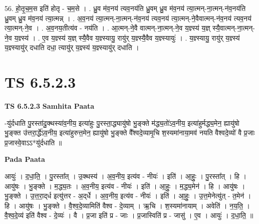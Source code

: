 \documentclass[17pt]{extarticle}
\begin{document}
56. हो॒तृ॒च॒म॒स इति॑ होतृ - च॒म॒से । . ध्रु॒व म॑व॒नय॑ त्यव॒नय॑ति ध्रु॒वम् ध्रु॒व म॑व॒नय॑ त्या॒त्मन्-ना॒त्मन्-न॑व॒नय॑ति ध्रु॒वम् ध्रु॒व म॑व॒नय॑ त्या॒त्मन्न् । . अ॒व॒नय॑ त्या॒त्मन्-ना॒त्मन्-न॑व॒नय॑ त्यव॒नय॑ त्या॒त्मन्-ने॒वैवात्मन्-न॑व॒नय॑ त्यव॒नय॑ त्या॒त्मन्-ने॒व । . अ॒व॒नय॒तीत्य॑व - नय॑ति । . आ॒त्मन्-ने॒वै वात्मन्-ना॒त्मन्-ने॒व य॒ज्ञ्स्य॑ य॒ज्ञ् स्यै॒वात्मन्-ना॒त्मन्-ने॒व य॒ज्ञ्स्य॑ । . ए॒व य॒ज्ञ्स्य॑ य॒ज्ञ् स्यै॒वैव य॒ज्ञ्स्यायु॒ रायु॑र् य॒ज्ञ्स्यै॒वैव य॒ज्ञ्स्यायुः॑ । . य॒ज्ञ्स्यायु॒ रायु॑र् य॒ज्ञ्स्य॑ य॒ज्ञ्स्यायु॑र् दधाति दधा॒ त्यायु॑र् य॒ज्ञ्स्य॑ य॒ज्ञ्स्यायु॑र् दधाति । \newline
\pagebreak
{}

\section{ TS 6.5.2.3 }

\textbf{TS 6.5.2.3 } \newline
\textbf{Samhita Paata} \newline

-यु॑र्दधाति पु॒रस्ता॑दु॒क्थस्या॑व॒नीय॒ इत्या॑हुः पु॒रस्ता॒द्ध्यायु॑षो भु॒ङ्क्ते म॑द्ध्य॒तो॑ऽव॒नीय॒ इत्या॑हुर्मद्ध्य॒मेन॒ ह्यायु॑षो भु॒ङ्क्त उ॑त्तरा॒र्द्धे॑ऽव॒नीय॒ इत्या॑हुरुत्त॒मेन॒ ह्यायु॑षो भु॒ङ्क्ते वै᳚श्वदे॒व्यामृ॒चि श॒स्यमा॑नाया॒मव॑ नयति वैश्वदे॒व्यो॑ वै प्र॒जाः प्र॒जास्वे॒वाऽऽ*यु॑र्दधाति ॥ \newline

\textbf{Pada Paata} \newline

आयुः॑ । द॒धा॒ति॒ । पु॒रस्ता᳚त् । उ॒क्थस्य॑ । अ॒व॒नीय॒ इत्य॑व - नीयः॑ । इति॑ । आ॒हुः॒ । पु॒रस्ता᳚त् । हि । आयु॑षः । भु॒ङ्क्ते । म॒द्ध्य॒तः । अ॒व॒नीय॒ इत्य॑व - नीयः॑ । इति॑ । आ॒हुः॒ । म॒द्ध्य॒मेन॑ । हि । आयु॑षः । भु॒ङ्क्ते । उ॒त्त॒रा॒द्‌र्ध इत्यु॑त्तर - अ॒द्‌र्धे । अ॒व॒नीय॒ इत्य॑व - नीयः॑ । इति॑ । आ॒हुः॒ । उ॒त्त॒मेनेत्यु॑त् - त॒मेन॑ । हि । आयु॑षः । भु॒ङ्क्ते । वै॒श्व॒दे॒व्यामिति॑ वैश्व - दे॒व्याम् । ऋ॒चि । श॒स्यमा॑नायाम् । अवेति॑ । न॒य॒ति॒ । वै॒श्व॒दे॒व्य॑ इति॑ वैश्व - दे॒व्यः॑ । वै । प्र॒जा इति॑ प्र - जाः । प्र॒जास्विति॑ प्र - जासु॑ । ए॒व । आयुः॑ । द॒धा॒ति॒ ॥  \newline
\end{document}
